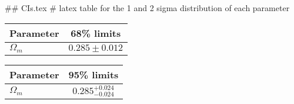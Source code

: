 ## CIs.tex
# latex table for the 1 and 2 sigma distribution of each parameter

\begin{tabular} { l  c}
 Parameter &  68\% limits\\
\hline
{\boldmath$\Omega_m       $} & $0.285\pm 0.012            $\\
\hline
\end{tabular}

\begin{tabular} { l  c}
 Parameter &  95\% limits\\
\hline
{\boldmath$\Omega_m       $} & $0.285^{+0.024}_{-0.024}   $\\
\hline
\end{tabular}
